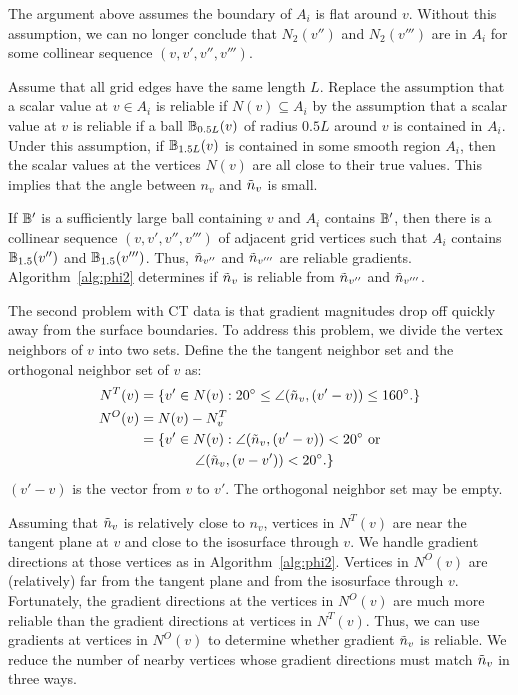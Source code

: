 The argument above assumes the boundary of $A_i$ is flat around $v$.
Without this assumption, we can no longer conclude that $N_2(v'')$
and $N_2(v''')$ are in $A_i$ for some collinear sequence $(v,v',v'',v''')$.

Assume that all grid edges have the same length $L$.
Replace the assumption that a scalar value at $v \in A_i$ is reliable
if $N(v) \subseteq A_i$
by the assumption that a scalar value at $v$ is reliable
if a ball $\mathbb{B}_{0.5L}(v)$ of radius $0.5L$ around $v$ 
is contained in $A_i$.
Under this assumption,
if $\mathbb{B}_{1.5L}(v)$ is contained in some smooth region $A_i$,
then the scalar values at the vertices $N(v)$ 
are all close to their true values.
This implies that the angle between $n_v$ and $\tilde{n}_v$ is small.

If $\mathbb{B}'$ is a sufficiently large ball containing $v$ and $A_i$
contains $\mathbb{B}'$,
then there is a collinear sequence $(v,v',v'',v''')$ 
of adjacent grid vertices 
such that $A_i$ contains $\mathbb{B}_{1.5}(v'')$ and $\mathbb{B}_{1.5}(v''')$.
Thus, $\tilde{n}_{v''}$ and $\tilde{n}_{v'''}$ are reliable gradients.
Algorithm~\ref{alg:phi2} determines if $\tilde{n}_v$ is reliable
from $\tilde{n}_{v''}$ and $\tilde{n}_{v'''}$.

The second problem with CT data is that gradient magnitudes 
drop off quickly away from the surface boundaries.
To address this problem,
we divide the vertex neighbors of $v$ into two sets.
Define the the tangent neighbor set and
the orthogonal neighbor set of $v$ as:
\begin{align*}
N^T(v) & = \{ v' \in N(v) : 
  20^\circ \le \angle(\tilde{n}_v,(v'-v)) \le 160^\circ. \} \\
N^O(v) & = N(v) - N^T_v \\
       & = \{ v' \in N(v) : \angle(\tilde{n}_v,(v'-v)) < 20^\circ \mbox{ or } \\
       & \qquad \qquad \angle(\tilde{n}_v,(v-v')) < 20^\circ. \}
\end{align*}
$(v'-v)$ is the vector from $v$ to $v'$.
The orthogonal neighbor set may be empty.

Assuming that $\tilde{n}_v$ is relatively close to $n_v$,
vertices in $N^T(v)$ are near the tangent plane at $v$
and close to the isosurface through $v$.
We handle gradient directions at those vertices as in Algorithm~\ref{alg:phi2}.
Vertices in $N^O(v)$ are (relatively) far from the tangent plane
and from the isosurface through $v$.
Fortunately, the gradient directions at the vertices in $N^O(v)$
are much more reliable than the gradient directions at vertices in $N^T(v)$.
Thus, we can use gradients at vertices in $N^O(v)$ 
to determine whether gradient $\tilde{n}_v$ is reliable.
We reduce the number of nearby vertices whose gradient directions
must match $\tilde{n}_v$ in three ways.

